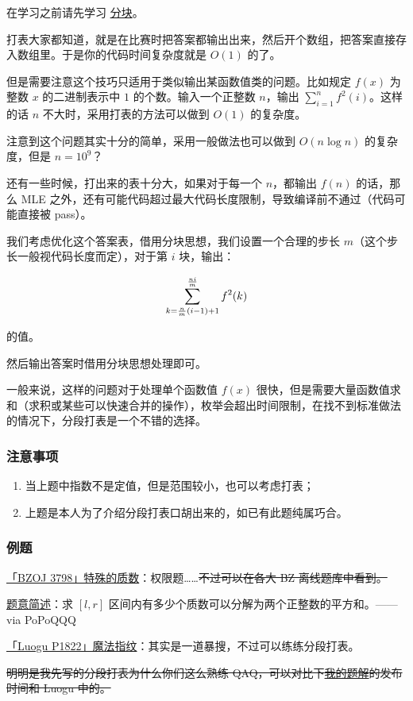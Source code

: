 
在学习之前请先学习 \href{/ds/square-root-decomposition/}{分块}。

打表大家都知道，就是在比赛时把答案都输出出来，然后开个数组，把答案直接存入数组里。于是你的代码时间复杂度就是 $O(1)$ 的了。

但是需要注意这个技巧只适用于类似输出某函数值类的问题。比如规定 $f(x)$ 为整数 $x$ 的二进制表示中 $1$ 的个数。输入一个正整数 $n$，输出 $\sum_{i=1}^nf^2(i)$。这样的话 $n$ 不大时，采用打表的方法可以做到 $O(1)$ 的复杂度。

注意到这个问题其实十分的简单，采用一般做法也可以做到 $O(n\log n)$ 的复杂度，但是 $n=10^9$？

还有一些时候，打出来的表十分大，如果对于每一个 $n$，都输出 $f(n)$ 的话，那么 MLE 之外，还有可能代码超过最大代码长度限制，导致编译前不通过（代码可能直接被 pass）。

我们考虑优化这个答案表，借用分块思想，我们设置一个合理的步长 $m$（这个步长一般视代码长度而定），对于第 $i$ 块，输出：

$$
\Large \sum_{k=\frac{n}{m}(i-1)+1}^{\frac{ni}{m}} f^2(k)
$$

的值。

然后输出答案时借用分块思想处理即可。

一般来说，这样的问题对于处理单个函数值 $f(x)$ 很快，但是需要大量函数值求和（求积或某些可以快速合并的操作），枚举会超出时间限制，在找不到标准做法的情况下，分段打表是一个不错的选择。

\subsubsection{注意事项}

\begin{enumerate}
\item 当上题中指数不是定值，但是范围较小，也可以考虑打表；
\item 上题是本人为了介绍分段打表口胡出来的，如已有此题纯属巧合。
\end{enumerate}

\subsubsection{例题}

\href{https://www.lydsy.com/JudgeOnline/problem.php?id=3798}{「BZOJ 3798」特殊的质数}：权限题……\st{不过可以在各大 BZ 离线题库中看到。}

\href{https://www.zhihu.com/question/60674478/answer/180805562}{题意简述}：求 $[l,r]$ 区间内有多少个质数可以分解为两个正整数的平方和。—— via PoPoQQQ

\href{https://www.luogu.org/problem/show?pid=P1822}{「Luogu P1822」魔法指纹}：其实是一道暴搜，不过可以练练分段打表。

\st{明明是我先写的分段打表为什么你们这么熟练 QAQ，可以对比下\href{https://blog.csdn.net/HeRaNO/article/details/78379324}{我的题解}的发布时间和 Luogu 中的。}
